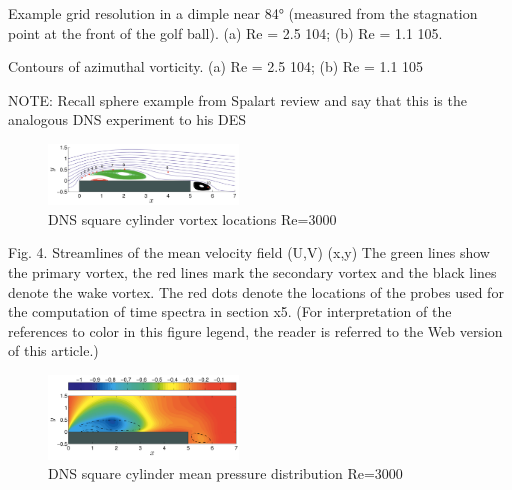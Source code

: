 \documentclass[journal]{new-aiaa}
\begin{document}
Example grid resolution in a dimple near 84° (measured from the stagnation point at the front of the golf ball). (a) Re = 2.5   104; (b) Re = 1.1   105.

Contours of azimuthal vorticity. (a) Re = 2.5   104; (b) Re = 1.1   105

NOTE: Recall sphere example from Spalart review and say that this is the analogous DNS experiment to his DES


\begin{figure}[H]
\begin{center}
\includegraphics[width=0.45\textwidth]{Images/logan/cimarelli2018direct_vortices.pdf}
\caption{ DNS square cylinder vortex locations Re=3000 \cite{cimarelli2018direct} }
\label{fig:dnsRectCylVortices}
\end{center}
\end{figure}


Fig. 4. Streamlines of the mean velocity field (U,V) (x,y)  The green lines show the primary vortex, the red lines mark the secondary vortex and the black lines denote the wake vortex. The red dots denote the locations of the probes used for the computation of time spectra in section x5. (For interpretation of the references to color in this figure legend, the reader is referred to the Web version of this article.)

\begin{figure}[H]
\begin{center}
\includegraphics[width=0.45\textwidth]{Images/logan/cimarelli2018direct_pressure.pdf}
\caption{ DNS square cylinder mean pressure distribution Re=3000 \cite{cimarelli2018direct} }
\label{fig:dnsRectCylPressure}
\end{center}
\end{figure}
\end{document}
